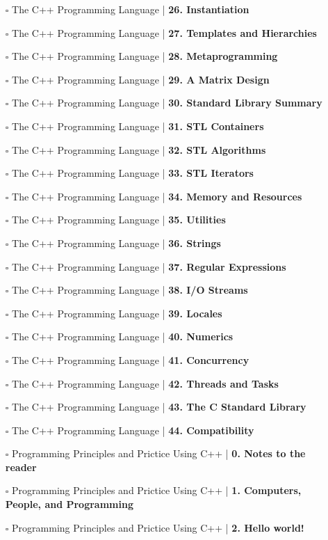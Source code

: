 \documentclass[a4, landscape, 12pt]{article}
\newcommand{\checkbox}{$\square$}%
\begin{document}
\begin{itemize}
{}
\item [\checkbox]  The C++ Programming Language | \textbf{ 26. Instantiation
}
\item [\checkbox]  The C++ Programming Language | \textbf{ 27. Templates and Hierarchies
}
\item [\checkbox]  The C++ Programming Language | \textbf{ 28. Metaprogramming
}
\item [\checkbox]  The C++ Programming Language | \textbf{ 29. A Matrix Design
}
\item [\checkbox]  The C++ Programming Language | \textbf{ 30. Standard Library Summary
}
\item [\checkbox]  The C++ Programming Language | \textbf{ 31. STL Containers
}
\item [\checkbox]  The C++ Programming Language | \textbf{ 32. STL Algorithms
}
\item [\checkbox]  The C++ Programming Language | \textbf{ 33. STL Iterators
}
\item [\checkbox]  The C++ Programming Language | \textbf{ 34. Memory and Resources
}
\item [\checkbox]  The C++ Programming Language | \textbf{ 35. Utilities
}
\item [\checkbox]  The C++ Programming Language | \textbf{ 36. Strings
}
\item [\checkbox]  The C++ Programming Language | \textbf{ 37. Regular Expressions
}
\item [\checkbox]  The C++ Programming Language | \textbf{ 38. I/O Streams
}
\item [\checkbox]  The C++ Programming Language | \textbf{ 39. Locales
}
\item [\checkbox]  The C++ Programming Language | \textbf{ 40. Numerics
}
\item [\checkbox]  The C++ Programming Language | \textbf{ 41. Concurrency
}
\item [\checkbox]  The C++ Programming Language | \textbf{ 42. Threads and Tasks
}
\item [\checkbox]  The C++ Programming Language | \textbf{ 43. The C Standard Library
}
\item [\checkbox]  The C++ Programming Language | \textbf{ 44. Compatibility
}
\item [\checkbox]  Programming Principles and Prictice Using C++  | \textbf{ 0. Notes to the reader
}
\item [\checkbox]  Programming Principles and Prictice Using C++  | \textbf{ 1. Computers, People, and Programming
}
\item [\checkbox]  Programming Principles and Prictice Using C++  | \textbf{ 2. Hello world!
}
\end{itemize}
\end{document}
